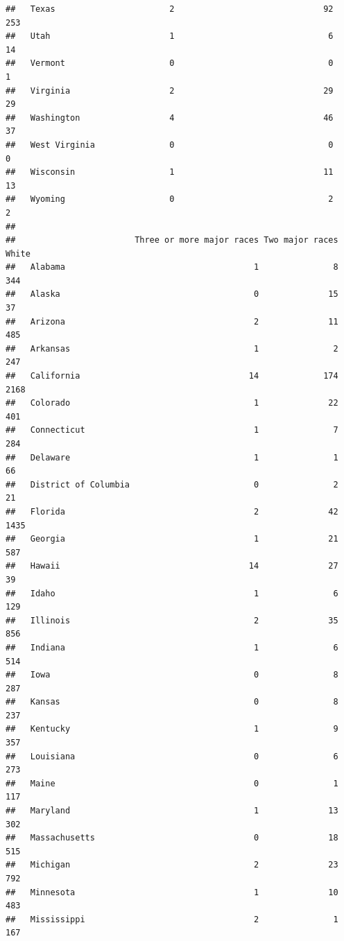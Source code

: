 \documentclass[
]{book}
\theoremstyle{definition}
\theoremstyle{definition}
\theoremstyle{definition}
\theoremstyle{definition}
\theoremstyle{remark}
\begin{document}
\begin{verbatim}
##   Texas                       2                              92             253
##   Utah                        1                               6              14
##   Vermont                     0                               0               1
##   Virginia                    2                              29              29
##   Washington                  4                              46              37
##   West Virginia               0                               0               0
##   Wisconsin                   1                              11              13
##   Wyoming                     0                               2               2
##                       
##                        Three or more major races Two major races White
##   Alabama                                      1               8   344
##   Alaska                                       0              15    37
##   Arizona                                      2              11   485
##   Arkansas                                     1               2   247
##   California                                  14             174  2168
##   Colorado                                     1              22   401
##   Connecticut                                  1               7   284
##   Delaware                                     1               1    66
##   District of Columbia                         0               2    21
##   Florida                                      2              42  1435
##   Georgia                                      1              21   587
##   Hawaii                                      14              27    39
##   Idaho                                        1               6   129
##   Illinois                                     2              35   856
##   Indiana                                      1               6   514
##   Iowa                                         0               8   287
##   Kansas                                       0               8   237
##   Kentucky                                     1               9   357
##   Louisiana                                    0               6   273
##   Maine                                        0               1   117
##   Maryland                                     1              13   302
##   Massachusetts                                0              18   515
##   Michigan                                     2              23   792
##   Minnesota                                    1              10   483
##   Mississippi                                  2               1   167

\end{verbatim}
\end{document}
